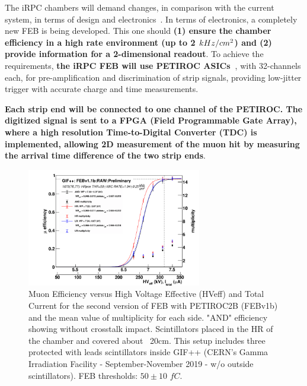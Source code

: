 The iRPC chambers will demand changes, in comparison with the current system, in terms of design and electronics~\cite{muon_tdr}. In terms of electronics, a completely new FEB is being developed. This one should \textbf{(1) ensure the chamber efficiency in a high rate environment (up to 2 ${\boldmath kHz/cm^2}$) and (2) provide information for a 2-dimensional readout}. To achieve the requirements, \textbf{the iRPC FEB will use PETIROC ASICs~\cite{petiroc}}, with 32-channels each, for pre-amplification and discrimination of strip signals, providing low-jitter trigger with accurate charge and time measurements. 


\begin{tcolorbox}[colback=gray!5,colframe=gray!40!black]
    \textbf{Each strip end will be connected to one channel of the PETIROC. The digitized signal is sent to a FPGA (Field Programmable Gate Array), where a high resolution Time-to-Digital Converter (TDC) is implemented, allowing 2D measurement of the muon hit by measuring the arrival time difference of the two strip ends}.
\end{tcolorbox}

\begin{figure}
    \caption{\footnotesize Muon Efficiency versus High Voltage Effective (HVeff) and Total Current for the second version of FEB with PETIROC2B (FEBv1b) and the mean value of multiplicity for each side. "AND" efficiency showing without crosstalk impact. Scintillators placed in the HR of the chamber and covered about ~20cm. This setup includes three protected with leads scintillators inside GIF++ (CERN's Gamma Irradiation Facility - September-November 2019 - w/o outside scintillators). FEB thresholds: $50\pm10$ $fC$.}\label{irpc_feb}

    \includegraphics[width=0.68\textwidth, trim = {2.5cm 0 0.5cm 0 }, clip]{uioposter-images/irpc_feb_eff_v2}
\end{figure}


